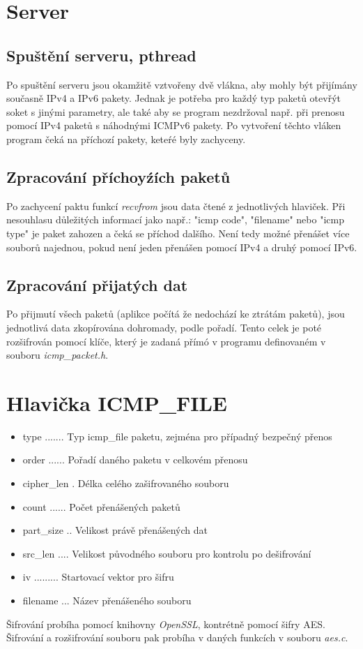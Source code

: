 \documentclass[a4paper, 11pt]{article}
\begin{document}
\newpage
\section{Server}

\subsection{Spuštění serveru, pthread}
Po spuštění serveru jsou okamžitě vztvořeny dvě vlákna, aby mohly být přijímány současně IPv4 a IPv6 pakety. Jednak je potřeba pro každý typ paketů otevřýt soket s jinými parametry, ale také aby se program nezdržoval např. při prenosu pomocí IPv4 paketů s náhodnými ICMPv6 pakety. Po vytvoření těchto vláken program čeká na příchozí pakety, keteŕé byly zachyceny.

\subsection{Zpracování příchoyźích paketů}
Po zachycení paktu funkcí \textit{recvfrom} jsou data čtené z jednotlivých hlaviček. Při nesouhlasu důležitých informací jako např.: "icmp code", "filename" nebo "icmp type" je paket zahozen a čeká se příchod dalšího. Není tedy možné přenášet více souborů najednou, pokud není jeden přenášen pomocí IPv4 a druhý pomocí IPv6.

\subsection{Zpracování přijatých dat}
Po přijmutí všech paketů (aplikce počítá že nedochází ke ztrátám paketů), jsou jednotlivá data zkopírována dohromady, podle pořadí. Tento celek je poté rozšifrován pomocí klíče, který je zadaná přímó v programu definovaném v souboru \textit{icmp\_packet.h}.

\section{Hlavička ICMP\_FILE}
\begin{itemize}
\item type ....... Typ icmp_file paketu, zejména pro případný bezpečný přenos
\item order ...... Pořadí daného paketu v celkovém přenosu
\item cipher_len . Délka celého zašifrovaného souboru
\item count ...... Počet přenášených paketů
\item part_size .. Velikost právě přenášených dat
\item src_len .... Velikost původného souboru pro kontrolu po dešifrování
\item iv ......... Startovací vektor pro šifru
\item filename ... Název přenášeného souboru
\end{itemize}

Šifrování probíha pomocí knihovny \textit{OpenSSL}, kontrétně pomocí šifry AES. Šifrování a rozšifrování souboru pak probíha v daných funkcích v souboru \textit{aes.c}.
\end{document}
